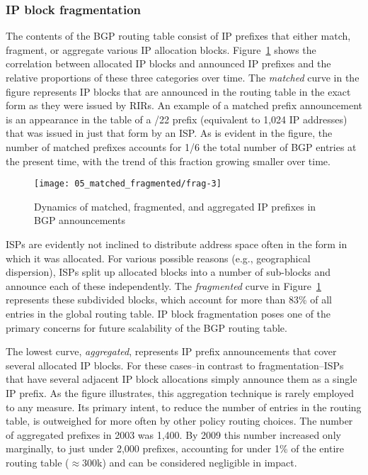 \subsubsection{IP block fragmentation}

The contents of the BGP routing table consist of IP prefixes that either match,
fragment, or aggregate various IP allocation blocks.
Figure~\ref{fig:fragmentation} shows the correlation between allocated IP
blocks and announced IP prefixes and the relative proportions of these three
categories over time. The \emph{matched} curve in the figure represents IP
blocks that are announced in the routing table in the exact form as they were
issued by RIRs. An example of a matched prefix announcement is an appearance in
the table of a /22 prefix (equivalent to 1,024 IP addresses) that was issued in
just that form by an ISP. As is evident in the figure, the number of matched
prefixes accounts for 1/6 the total number of BGP entries at the present time,
with the trend of this fraction growing smaller over time.

\begin{figure}[htbp]
	\centering
		\texttt{[image: 05\_matched\_fragmented/frag-3]}
	\caption{Dynamics of matched, fragmented, and aggregated IP prefixes in BGP announcements}
	\label{fig:fragmentation}
\end{figure}

ISPs are evidently not inclined to distribute address space often in the form
in which it was allocated. For various possible reasons (e.g., geographical
dispersion), ISPs split up allocated blocks into a number of sub-blocks and
announce each of these independently. The \emph{fragmented} curve in
Figure~\ref{fig:fragmentation} represents these subdivided blocks, which
account for more than 83\% of all entries in the global routing table. IP block
fragmentation poses one of the primary concerns for future scalability of the
BGP routing table.

The lowest curve, \emph{aggregated}, represents IP prefix announcements that
cover several allocated IP blocks. For these cases--in contrast to
fragmentation--ISPs that have several adjacent IP block allocations simply
announce them as a single IP prefix. As the figure illustrates, this
aggregation technique is rarely employed to any measure. Its primary intent, to
reduce the number of entries in the routing table, is outweighed for more often
by other policy routing choices. The number of aggregated prefixes in 2003 was
1,400.  By 2009 this number increased only marginally, to just under 2,000
prefixes, accounting for under 1\% of the entire routing table ($\approx$300k)
and can be considered negligible in impact.

